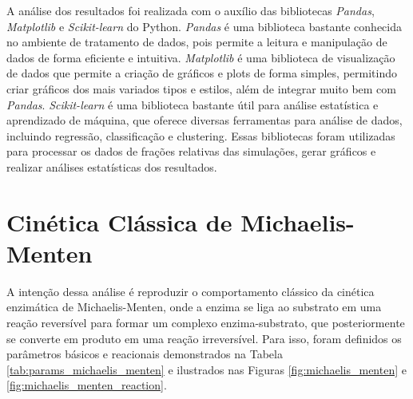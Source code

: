 \documentclass[12pt,oneside]{report}
\begin{document}
A análise dos resultados foi realizada com o auxílio das bibliotecas \textit{Pandas}, \textit{Matplotlib} e \textit{Scikit-learn} do Python. \textit{Pandas} é uma biblioteca bastante conhecida no ambiente de tratamento de dados, pois permite a leitura e manipulação de dados de forma eficiente e intuitiva. \textit{Matplotlib} é uma biblioteca de visualização de dados que permite a criação de gráficos e plots de forma simples, permitindo criar gráficos dos mais variados tipos e estilos, além de integrar muito bem com \textit{Pandas}. \textit{Scikit-learn} é uma biblioteca bastante útil para análise estatística e aprendizado de máquina, que oferece diversas ferramentas para análise de dados, incluindo regressão, classificação e clustering. Essas bibliotecas foram utilizadas para processar os dados de frações relativas das simulações, gerar gráficos e realizar análises estatísticas dos resultados.

\section{Cinética Clássica de Michaelis-Menten}

A intenção dessa análise é reproduzir o comportamento clássico da cinética enzimática de Michaelis-Menten, onde a enzima se liga ao substrato em uma reação reversível para formar um complexo enzima-substrato, que posteriormente se converte em produto em uma reação irreversível. Para isso, foram definidos os parâmetros básicos e reacionais demonstrados na Tabela \ref{tab:params_michaelis_menten} e ilustrados nas Figuras \ref{fig:michaelis_menten} e \ref{fig:michaelis_menten_reaction}.
\end{document}
